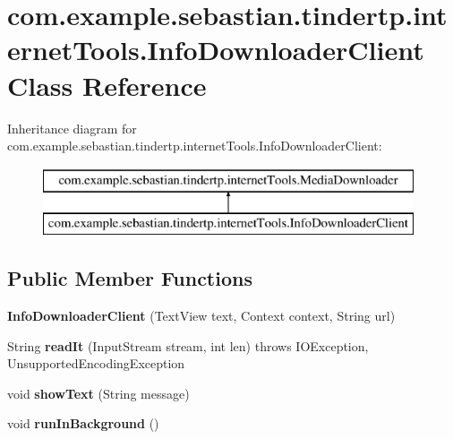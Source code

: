 \hypertarget{classcom_1_1example_1_1sebastian_1_1tindertp_1_1internetTools_1_1InfoDownloaderClient}{}\section{com.\+example.\+sebastian.\+tindertp.\+internet\+Tools.\+Info\+Downloader\+Client Class Reference}
\label{classcom_1_1example_1_1sebastian_1_1tindertp_1_1internetTools_1_1InfoDownloaderClient}
Inheritance diagram for com.\+example.\+sebastian.\+tindertp.\+internet\+Tools.\+Info\+Downloader\+Client\+:\begin{figure}[H]
\begin{center}
\leavevmode
\includegraphics[height=2.000000cm]{classcom_1_1example_1_1sebastian_1_1tindertp_1_1internetTools_1_1InfoDownloaderClient}
\end{center}
\end{figure}
\subsection*{Public Member Functions}
\begin{DoxyCompactItemize}
\item 
{\bfseries Info\+Downloader\+Client} (Text\+View text, Context context, String url)\hypertarget{classcom_1_1example_1_1sebastian_1_1tindertp_1_1internetTools_1_1InfoDownloaderClient_aa54e93af6dc1927dfe55bb51d32cdaf5}{}\label{classcom_1_1example_1_1sebastian_1_1tindertp_1_1internetTools_1_1InfoDownloaderClient_aa54e93af6dc1927dfe55bb51d32cdaf5}

\item 
String {\bfseries read\+It} (Input\+Stream stream, int len)  throws I\+O\+Exception, Unsupported\+Encoding\+Exception \hypertarget{classcom_1_1example_1_1sebastian_1_1tindertp_1_1internetTools_1_1InfoDownloaderClient_af4ce56ee848c2ae144c5138537fcebc3}{}\label{classcom_1_1example_1_1sebastian_1_1tindertp_1_1internetTools_1_1InfoDownloaderClient_af4ce56ee848c2ae144c5138537fcebc3}

\item 
void {\bfseries show\+Text} (String message)\hypertarget{classcom_1_1example_1_1sebastian_1_1tindertp_1_1internetTools_1_1InfoDownloaderClient_acbbb215c97cd0f0d90be7543d6fb5c99}{}\label{classcom_1_1example_1_1sebastian_1_1tindertp_1_1internetTools_1_1InfoDownloaderClient_acbbb215c97cd0f0d90be7543d6fb5c99}

\item 
void {\bfseries run\+In\+Background} ()\hypertarget{classcom_1_1example_1_1sebastian_1_1tindertp_1_1internetTools_1_1InfoDownloaderClient_abb73f39b841d14e1ab56e1dd090cac1a}{}\label{classcom_1_1example_1_1sebastian_1_1tindertp_1_1internetTools_1_1InfoDownloaderClient_abb73f39b841d14e1ab56e1dd090cac1a}

\end{DoxyCompactItemize}
